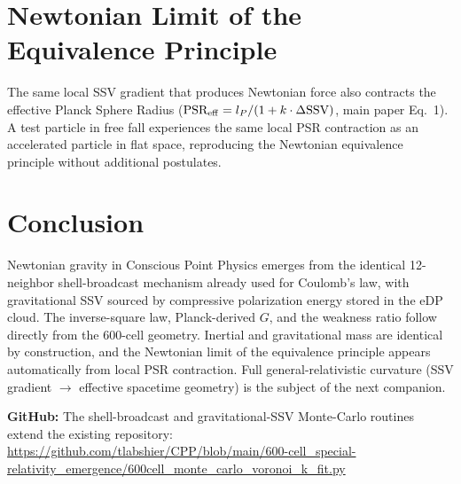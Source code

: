 \documentclass[12pt]{article}
\newcommand{\lP}{l_P}
\begin{document}
\section{Newtonian Limit of the Equivalence Principle}
The same local SSV gradient that produces Newtonian force also contracts the effective Planck Sphere Radius (\(\text{PSR}_{\rm eff} = \lP / (1 + k \cdot \Delta\text{SSV})\), main paper Eq.~1). A test particle in free fall experiences the same local PSR contraction as an accelerated particle in flat space, reproducing the Newtonian equivalence principle without additional postulates.

\section{Conclusion}
Newtonian gravity in Conscious Point Physics emerges from the identical 12-neighbor shell-broadcast mechanism already used for Coulomb’s law, with gravitational SSV sourced by compressive polarization energy stored in the eDP cloud. The inverse-square law, Planck-derived \(G\), and the weakness ratio follow directly from the 600-cell geometry. Inertial and gravitational mass are identical by construction, and the Newtonian limit of the equivalence principle appears automatically from local PSR contraction. Full general-relativistic curvature (SSV gradient \(\to\) effective spacetime geometry) is the subject of the next companion.

\textbf{GitHub:} The shell-broadcast and gravitational-SSV Monte-Carlo routines extend the existing repository:  
\url{https://github.com/tlabshier/CPP/blob/main/600-cell_special-relativity_emergence/600cell_monte_carlo_voronoi_k_fit.py}
\end{document}
